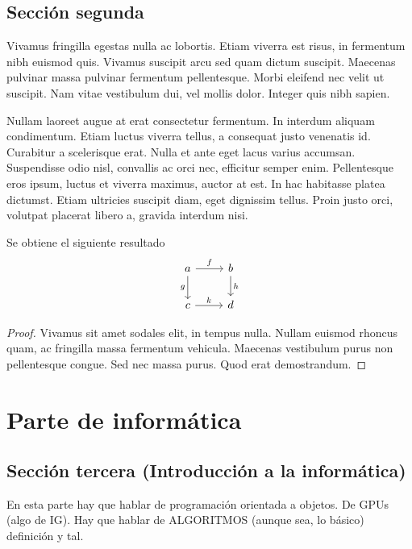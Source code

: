 \documentclass[oneside,openright,titlepage,numbers=noenddot,openany,headinclude,footinclude=true,
cleardoublepage=empty,abstractoff,BCOR=5mm,paper=a4,fontsize=12pt,main=spanish]{scrreprt}
\begin{document}
\chapter{Sección segunda}
Vivamus fringilla egestas nulla ac lobortis. Etiam viverra est risus,
in fermentum nibh euismod quis. Vivamus suscipit arcu sed quam dictum
suscipit. Maecenas pulvinar massa pulvinar fermentum
pellentesque. Morbi eleifend nec velit ut suscipit. Nam vitae
vestibulum dui, vel mollis dolor. Integer quis nibh sapien.

Nullam laoreet augue at erat consectetur fermentum. In interdum
aliquam condimentum. Etiam luctus viverra tellus, a consequat justo
venenatis id. Curabitur a scelerisque erat. Nulla et ante eget lacus
varius accumsan. Suspendisse odio nisl, convallis ac orci nec,
efficitur semper enim. Pellentesque eros ipsum, luctus et viverra
maximus, auctor at est. In hac habitasse platea dictumst. Etiam
ultricies suscipit diam, eget dignissim tellus. Proin justo orci,
volutpat placerat libero a, gravida interdum nisi.

\begin{corollary}
Se obtiene el siguiente resultado
\[\begin{tikzcd}
a\rar{f} \dar[swap]{g} & b \dar{h} \\
c\rar{k} & d
\end{tikzcd}\]
\end{corollary}
\begin{proof}
  Vivamus sit amet sodales elit, in tempus nulla. Nullam euismod
  rhoncus quam, ac fringilla massa fermentum vehicula. Maecenas
  vestibulum purus non pellentesque congue. Sed nec massa purus.
  Quod erat demostrandum.
\end{proof}


\part{Parte de informática}
\chapter{Sección tercera (Introducción a la informática)}
{\Large En esta parte hay que hablar de programación orientada a objetos. De GPUs (algo de IG). Hay que hablar de ALGORITMOS (aunque sea, lo básico) definición y tal. }
\end{document}
